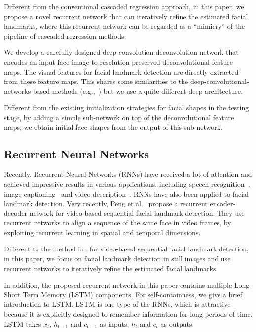 \documentclass[journal]{IEEEtran}
\begin{document}
Different from the conventional cascaded regression approach, in this paper, we propose a novel recurrent network that can iteratively refine the estimated facial landmarks, where this recurrent network can be regarded as a ``mimicry'' of the pipeline of cascaded regression methods.

We develop a carefully-designed deep convolution-deconvolution network that encodes an input face image to resolution-preserved deconvolutional feature maps. The visual features for facial landmark detection are directly extracted from these feature maps. This shares some similarities to the deep-convolutional-networks-based methods (e.g.,~\cite{sun2013deep,zhang2014coarse,liu2015dual}) but we use a quite different deep architecture.

Different from the existing initialization strategies for facial shapes in the testing stage, by adding a simple sub-network on top of the deconvolutional feature maps, we obtain initial face shapes from the output of this sub-network.

\subsection{Recurrent Neural Networks}

Recently, Recurrent Neural Networks (RNNs) have received a lot of attention and achieved impressive results in various applications, including speech recognition~\cite{lstm_speech}, image captioning~\cite{showtell} and video description~\cite{videoCVPR}. RNNs have also been applied to facial landmark detection. Very recently, Peng et al.~\cite{peng2016recurrent} propose a recurrent encoder-decoder network for video-based sequential facial landmark detection. They use recurrent networks to align a sequence of the same face in video frames, by exploiting recurrent learning in spatial and temporal dimensions.


Different to the method in~\cite{peng2016recurrent} for video-based sequential facial landmark detection, in this paper, we focus on facial landmark detection in still images and use recurrent networks to iteratively refine the estimated facial landmarks.

In addition, the proposed recurrent network in this paper contains multiple Long-Short Term Memory (LSTM) components. For self-containness, we give a brief introduction to LSTM. LSTM is one type of the RNNs, which is attractive because it is explicitly designed to remember information for long periods of time. LSTM takes $x_t$, $h_{t-1}$ and $c_{t-1}$ as inputs, $h_t$ and $c_t$ as outputs:
\end{document}
